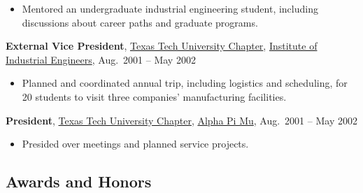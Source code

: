 \documentclass[
]{article}
\providecommand{\tightlist}{%
  \setlength{\itemsep}{0pt}\setlength{\parskip}{0pt}}
\begin{document}
\begin{itemize}
\tightlist
\item
  Mentored an undergraduate industrial engineering student, including
  discussions about career paths and graduate programs.
\end{itemize}

\textbf{External Vice President},
\href{https://ttu.campuslabs.com/engage/organization/ttuiise}{Texas Tech
University Chapter}, \href{https://www.iise.org/}{Institute of
Industrial Engineers}, Aug.~2001 -- May 2002

\begin{itemize}
\tightlist
\item
  Planned and coordinated annual trip, including logistics and
  scheduling, for 20 students to visit three companies' manufacturing
  facilities.
\end{itemize}

\textbf{President}, \href{https://alphapimu.com/region-6/}{Texas Tech
University Chapter}, \href{https://alphapimu.com/}{Alpha Pi Mu},
Aug.~2001 -- May 2002

\begin{itemize}
\tightlist
\item
  Presided over meetings and planned service projects.
\end{itemize}

\hypertarget{awards-and-honors}{%
\subsection{Awards and Honors}\label{awards-and-honors}}
\end{document}
